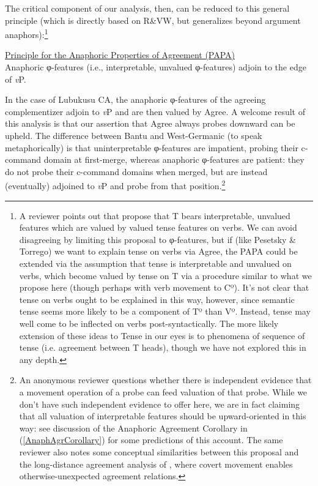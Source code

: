 \documentclass[output=paper
,modfonts
,nonflat
]{langsci/langscibook}
\begin{document}
\noindent The critical component of our analysis, then, can be reduced to this general principle (which is directly based on R\&VW, but generalizes beyond argument anaphors):\footnote{A reviewer points out that \citealt{Pesetsky:2007} propose that T bears interpretable, unvalued features which are valued by valued tense features on verbs. We can avoid disagreeing by limiting this proposal to φ-features, but if (like Pesetsky \& Torrego) we want to explain tense on verbs via Agree, the PAPA could be extended via the assumption that tense is interpretable and unvalued on verbs, which become valued by tense on T via a procedure similar to what we propose here (though perhaps with verb movement to Cº). It's not clear that tense on verbs ought to be explained in this way, however, since semantic tense seems more likely to be a component of Tº than Vº. Instead, tense may well come to be inflected on verbs post-syntactically. The more likely extension of these ideas to Tense in our eyes is to phenomena of sequence of tense (i.e. agreement between T heads), though we have not explored this in any depth.} 

\ea	\label{PAPA}
\underline{Principle for the Anaphoric Properties of Agreement  (PAPA)} \\
Anaphoric φ-features (i.e., interpretable, unvalued φ-features) adjoin to the edge of \textit{v}P.

\z

In the case of Lubukusu CA, the anaphoric φ-features of the agreeing complementizer adjoin to \textit{v}P and are then valued by Agree. A welcome result of this analysis is that our assertion that Agree always probes downward can be upheld. The difference between Bantu and West-Germanic (to speak metaphorically) is that uninterpretable φ-features are impatient, probing their c-command domain at first-merge, whereas anaphoric φ-features are patient: they do not probe their c-command domains when merged, but are instead (eventually) adjoined to \textit{v}P and probe from that position.\footnote{An anonymous reviewer questions whether there is independent evidence that a movement operation of a probe can feed valuation of that probe. While we don't have such independent evidence to offer here, we are in fact claiming that all valuation of interpretable features should be upward-oriented in this way: see discussion of the Anaphoric Agreement Corollary in (\ref{AnaphAgrCorollary}) for some predictions of this account. The same reviewer also notes some conceptual similarities between this proposal and the long-distance agreement analysis of \citet{Potsdam:2001}, where covert movement enables otherwise-unexpected agreement relations.}  
\end{document}
